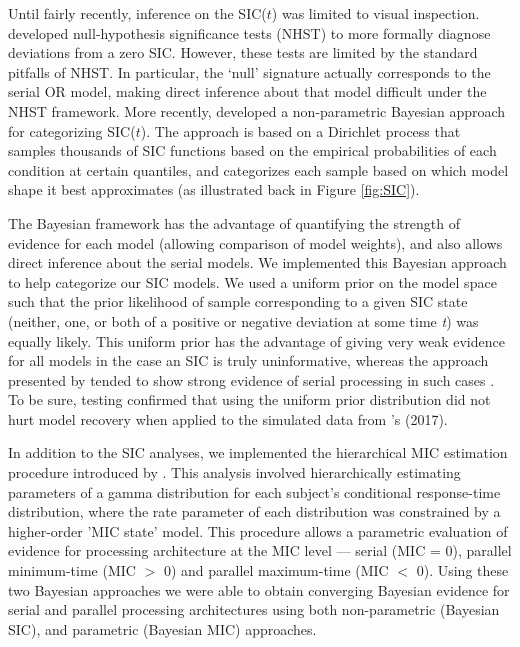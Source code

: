 Until fairly recently, inference on the SIC($t$) was limited to visual inspection. \citeauthor{houpt2010statSIC} \citeyear{houpt2010statSIC} developed null-hypothesis significance tests (NHST) to more formally diagnose deviations from a zero SIC. However, these tests are limited by the standard pitfalls of NHST. In particular, the `null' signature actually corresponds to the serial OR model, making direct inference about that model difficult under the NHST framework. More recently,  developed a non-parametric Bayesian approach for categorizing SIC($t$). The approach is based on a Dirichlet process that samples thousands of SIC functions based on the empirical probabilities of each condition at certain quantiles, and categorizes each sample based on which model shape it best approximates (as illustrated back in Figure \ref{fig:SIC}).

The Bayesian framework has the advantage of quantifying the strength of evidence for each model (allowing comparison of model weights), and also allows direct inference about the serial models. We implemented this Bayesian approach to help categorize our SIC models. We used a uniform prior on the model space such that the prior likelihood of sample corresponding to a given SIC state (neither, one, or both of a positive or negative deviation at some time \textit{t}) was equally likely. This uniform prior has the advantage of giving very weak evidence for all models in the case an SIC is truly uninformative, whereas the approach presented by \citeauthor{houpt2017bayesSIC} tended to show strong evidence of serial processing in such cases \cite{houpt2017bayesSIC}. To be sure, testing confirmed that using the uniform prior distribution did not hurt model recovery when applied to the simulated data from \citeauthor{houpt2017bayesSIC}'s (2017).

In addition to the SIC analyses, we implemented the hierarchical MIC estimation procedure introduced by \cite{houpt2017hierarchical}.
This analysis involved hierarchically estimating parameters of a gamma distribution for each subject's conditional response-time distribution, where the rate parameter of each distribution was constrained by a higher-order 'MIC state' model. This procedure allows a parametric evaluation of evidence for processing architecture at the MIC level --- serial (MIC = 0), parallel minimum-time (MIC $>$ 0) and parallel maximum-time (MIC $<$ 0). Using these two Bayesian approaches we were able to obtain converging Bayesian evidence for serial and parallel processing architectures using both non-parametric (Bayesian SIC), and parametric (Bayesian MIC) approaches. 

